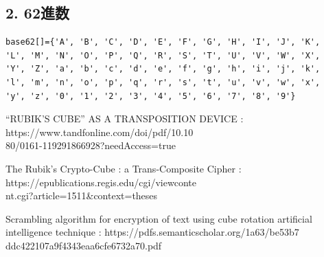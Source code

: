 \documentclass[titlepage]{jarticle}
\begin{document}
\subsection{2. 62進数}
\begin{verbatim}
base62[]={'A', 'B', 'C', 'D', 'E', 'F', 'G', 'H', 'I', 'J', 'K', 
'L', 'M', 'N', 'O', 'P', 'Q', 'R', 'S', 'T', 'U', 'V', 'W', 'X', 
'Y', 'Z', 'a', 'b', 'c', 'd', 'e', 'f', 'g', 'h', 'i', 'j', 'k', 
'l', 'm', 'n', 'o', 'p', 'q', 'r', 's', 't', 'u', 'v', 'w', 'x', 
'y', 'z', '0', '1', '2', '3', '4', '5', '6', '7', '8', '9'}
\end{verbatim}

\begin{flushleft}
\begin{thebibliography}{}

 “RUBIK'S CUBE” AS A TRANSPOSITION DEVICE : https://www.tandfonline.com/doi/pdf/10.10\\80/0161-119291866928?needAccess=true

The Rubik's Crypto-Cube : a Trans-Composite Cipher : https://epublications.regis.edu/cgi/viewconte\\nt.cgi?article=1511\&context=theses

Scrambling algorithm for encryption of text using cube rotation artificial intelligence technique : https://pdfs.semanticscholar.org/1a63/be53b7\\ddc422107a9f4343eaa6cfe6732a70.pdf

\end{thebibliography}
\end{flushleft}
\end{document}
